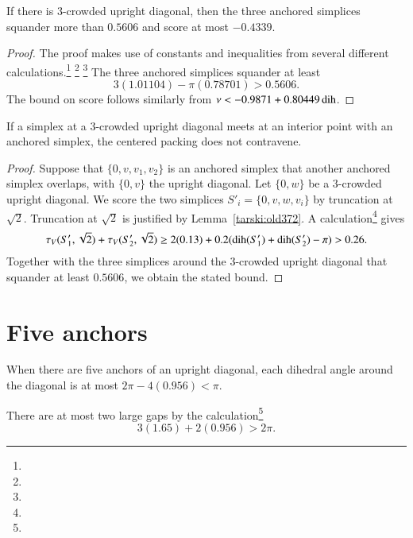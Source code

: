 \begin{lemma}
    \label{lemma:3-crowded}
If there is $3$-crowded upright diagonal, then the three anchored
simplices squander more than $0.5606$ and score at most $-0.4339$.
\end{lemma}


\begin{proof}  The proof makes use of constants and inequalities from
several different calculations.\footnote{} %
\footnote{} %
\footnote{} %
The three anchored simplices squander at
least
    $$
    3 (1.01104) - \pi (0.78701) > 0.5606.
    $$
The bound on score follows similarly from $\nu<-0.9871+0.80449\operatorname{dih}$.
\end{proof}

\begin{lemma}
If a simplex at a $3$-crowded upright diagonal meets at an
interior point with an anchored simplex, the centered packing does
not contravene.
\end{lemma}

\begin{proof}
Suppose that $\{0,v,v_1,v_2\}$ is an anchored simplex that another
anchored simplex overlaps, with $\{0,v\}$ the upright diagonal.  Let
$\{0,w\}$ be a $3$-crowded upright diagonal. We score the two
simplices $S'_i = \{0,v,w,v_i\}$ by truncation at $\sqrt{2}$.
Truncation at $\sqrt{2}$ is justified by Lemma~\ref{tarski:old372}.
A calculation\footnote{} %
gives
    $$\tau_V(S'_1,\sqrt{2})+\tau_V(S'_2,\sqrt{2})\ge 2(0.13) +
        0.2(\operatorname{dih}(S'_1)+\operatorname{dih}(S'_2)-\pi) > 0.26.
    $$
Together with the three simplices around the $3$-crowded upright
diagonal that squander at least $0.5606$, we obtain the stated
bound.
\end{proof}



\section{Five anchors} %
    \label{sec:five-anchors}


When there are five anchors of an upright diagonal, each dihedral angle
around the diagonal is at most $2\pi-4(0.956)<\pi$.

\begin{remark}\label{rem:2gap}
There are at most
two large gaps by the calculation\footnote{} %
    $$3(1.65)+2(0.956)>2\pi.$$
\end{remark}

